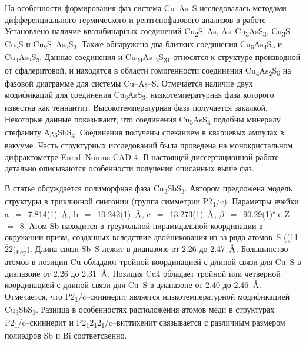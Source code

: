 На особенности формирования фаз система Cu--As--S исследовалась методами дифференциального термического и рентгенофазового анализов в работе \cite{Kurz_1989}. Установлено наличие квазибинарных соединений Cu\textsubscript{2}S--As, As--Cu\textsubscript{3}AsS\textsubscript{3}, Cu\textsubscript{3}S--Cu\textsubscript{2}S и Cu\textsubscript{2}S--As\textsubscript{2}S\textsubscript{3}. Также обнаружено два близких соединения Cu\textsubscript{6}As\textsubscript{4}S\textsubscript{9} и Cu\textsubscript{4}As\textsubscript{2}S\textsubscript{5}. Данные соединения и Cu\textsubscript{24}As\textsubscript{12}S\textsubscript{31} относятся к структуре производной от сфалеритовой, и находятся в области гомогенности соединения Cu\textsubscript{4}As\textsubscript{2}S\textsubscript{5} на фазовой диаграмме для системы  Cu--As--S. Отмечается наличие двух модификаций для соединения Cu\textsubscript{3}AsS\textsubscript{3}, низкотемпературная фаза которого известна как теннантит. Высокотемпературная фаза получается закалкой. Некоторые данные показывают, что соединения Cu\textsubscript{5}AsS\textsubscript{4} подобны минералу стефаниту Ag\textsubscript{5}SbS\textsubscript{4}. Соединения получены спеканием в кварцевых ампулах в вакууме. Часть структурных исследований была проведена на монокристальном дифрактометре Enraf--Nonius CAD 4. В настоящей диссертационной работе детально описываются особенности получения описанных выше фаз.

В статье \cite{Makovicky1995} обсуждается полиморфная фаза Cu\textsubscript{3}SbS\textsubscript{3}. Автором предложена модель  структуры в триклинной сингонии (группа симметрии P2\textsubscript{1}/c). Параметры ячейки a~$=$~7.814(1)~$\mbox{\normalfont\AA}$, b~$=$~10.242(1)~$\mbox{\normalfont\AA}$, c~$=$~13.273(1)~$\mbox{\normalfont\AA}$, $\beta$~$=$~90.29(1)\textsuperscript{$\circ$} c Z~$=$~8. Атом Sb находится в треугольной пирамидальной координации в окружении призм, созданных вследствие двойникования из-за ряда атомов~S ((11$\overline{\!2}$2)\textsubscript{hcp}). Длина связи Sb--S лежит в диапазоне от 2.26 до 2.47~$\mbox{\normalfont\AA}$. Большинство атомов в позиции Cu обладают тройной координацией с длиной связи для Cu--S в диапазоне от 2.26 до 2.31~$\mbox{\normalfont\AA}$. Позиция Cu4 обладает тройной или четверной координацией с длиной связи для Cu--S в диапазоне от 2.40 до 2.46~$\mbox{\normalfont\AA}$. Отмечается, что P2\textsubscript{1}/c--скиннерит является низкотемпературной модификацией Cu\textsubscript{3}SbS\textsubscript{3}. Разница в особенностях расположения атомов меди в структурах P2\textsubscript{1}/c--скиннерит и P2\textsubscript{1}2\textsubscript{1}2\textsubscript{1}/c--виттихенит связывается с различным размером полиэдров Sb и Bi соответсвенно.


